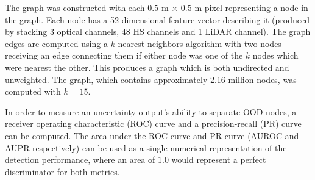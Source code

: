 \documentclass[
twocolumn,
]{ceurart}
\begin{document}
The graph was constructed with each $0.5$ m $\times$ $0.5$ m pixel representing a node in the graph.
Each node has a 52-dimensional feature vector describing it (produced by stacking 3 optical channels, 48 HS channels and 1 LiDAR channel).
The graph edges are computed using a $k$-nearest neighbors algorithm with two nodes receiving an edge connecting them if either node was one of the $k$ nodes which were nearest the other.
This produces a graph which is both undirected and unweighted.
The graph, which contains approximately 2.16 million nodes, was computed with $k=15$.

In order to measure an uncertainty output's ability to separate OOD nodes, a receiver operating characteristic (ROC) curve and a precision-recall (PR) curve can be computed.
The area under the ROC curve and PR curve (AUROC and AUPR respectively) can be used as a single numerical representation of the detection performance, where an area of $1.0$ would represent a perfect discriminator for both metrics.

\end{document}
